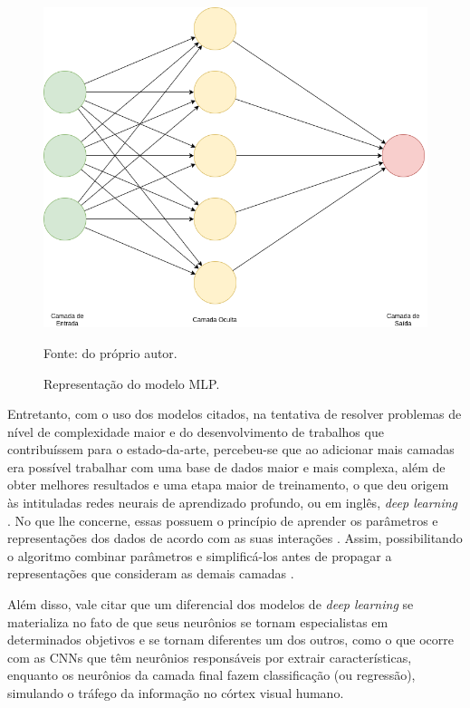 \begin{figure}[H]
    \centering
    \caption{Representação do modelo MLP.}
    \includegraphics[width=1\linewidth]{recursos/imagens/deep/mlp.png}
    \label{deep:fig:4}

    Fonte: do próprio autor.
\end{figure}

Entretanto, com o uso dos modelos citados, na tentativa de resolver problemas de nível de complexidade maior e do desenvolvimento de trabalhos que contribuíssem para o estado-da-arte, percebeu-se que ao adicionar mais camadas era possível trabalhar com uma base de dados maior e mais complexa, além de obter melhores resultados e uma etapa maior de treinamento, o que deu origem às intituladas redes neurais de aprendizado profundo, ou em inglês, \textit{deep learning} \citep{Goodfellow2016}. No que lhe concerne, essas possuem o princípio de aprender os parâmetros e representações dos dados de acordo com as suas interações \citep{ponti2018funciona}. Assim, possibilitando o algoritmo combinar parâmetros e simplificá-los antes de propagar a representações que consideram as demais camadas \citep{Goodfellow2016}.

Além disso, vale citar que um diferencial dos modelos de \textit{deep learning} se materializa no fato de que seus neurônios se tornam especialistas em determinados objetivos e se tornam diferentes um dos outros, como o que ocorre com as CNNs que têm neurônios responsáveis por extrair características, enquanto os neurônios da camada final fazem classificação (ou regressão), simulando o tráfego da informação no córtex visual humano.


